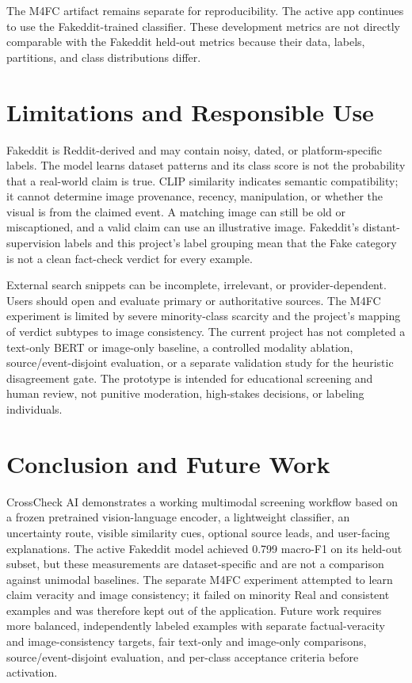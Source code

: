 \documentclass[conference]{IEEEtran}
\begin{document}
The M4FC artifact remains separate for reproducibility. The active app continues to use the Fakeddit-trained classifier. These development metrics are not directly comparable with the Fakeddit held-out metrics because their data, labels, partitions, and class distributions differ.

\section{Limitations and Responsible Use}
Fakeddit is Reddit-derived and may contain noisy, dated, or platform-specific labels. The model learns dataset patterns and its class score is not the probability that a real-world claim is true. CLIP similarity indicates semantic compatibility; it cannot determine image provenance, recency, manipulation, or whether the visual is from the claimed event. A matching image can still be old or miscaptioned, and a valid claim can use an illustrative image. Fakeddit's distant-supervision labels and this project's label grouping mean that the Fake category is not a clean fact-check verdict for every example.

External search snippets can be incomplete, irrelevant, or provider-dependent. Users should open and evaluate primary or authoritative sources. The M4FC experiment is limited by severe minority-class scarcity and the project's mapping of verdict subtypes to image consistency. The current project has not completed a text-only BERT or image-only baseline, a controlled modality ablation, source/event-disjoint evaluation, or a separate validation study for the heuristic disagreement gate. The prototype is intended for educational screening and human review, not punitive moderation, high-stakes decisions, or labeling individuals.

\section{Conclusion and Future Work}
CrossCheck AI demonstrates a working multimodal screening workflow based on a frozen pretrained vision-language encoder, a lightweight classifier, an uncertainty route, visible similarity cues, optional source leads, and user-facing explanations. The active Fakeddit model achieved 0.799 macro-F1 on its held-out subset, but these measurements are dataset-specific and are not a comparison against unimodal baselines. The separate M4FC experiment attempted to learn claim veracity and image consistency; it failed on minority Real and consistent examples and was therefore kept out of the application. Future work requires more balanced, independently labeled examples with separate factual-veracity and image-consistency targets, fair text-only and image-only comparisons, source/event-disjoint evaluation, and per-class acceptance criteria before activation.
\end{document}
